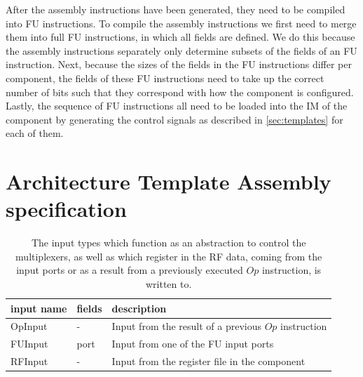 After the assembly instructions have been generated, they need to be compiled into FU instructions. To compile the assembly instructions we first need to merge them into full FU instructions, in which all fields are defined. We do this because the assembly instructions separately only determine subsets of the fields of an FU instruction. Next, because the sizes of the fields in the FU instructions differ per component, the fields of these FU instructions need to take up the correct number of bits such that they correspond with how the component is configured. Lastly, the sequence of FU instructions all need to be loaded into the IM of the component by generating the control signals as described in \ref{sec:templates} for each of them.


\section{Architecture Template Assembly specification}
\label{sec:assembly}
\begin{table}
    \centering
    \begin{tabular}{@{}l|ll@{}}
        \toprule
        input name & fields & description\\
        \hline
        OpInput & - & Input from the result of a previous $Op$ instruction\\
        FUInput & port & Input from one of the FU input ports\\
        RFInput & - & Input from the register file in the component\\
        \bottomrule
    \end{tabular}
    \caption{The input types which function as an abstraction to control the multiplexers, as well as which register in the RF data, coming from the input ports or as a result from a previously executed $Op$ instruction, is written to.}
    \label{tab:inputs}
\end{table}

